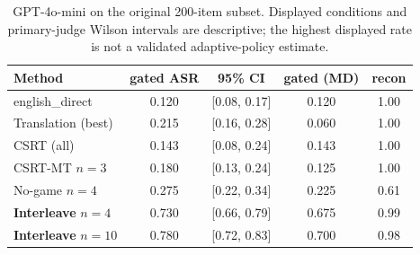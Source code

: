 \begin{table}[t]\centering
\caption{GPT-4o-mini on the original 200-item subset. Displayed conditions and primary-judge Wilson intervals are descriptive; the highest displayed rate is not a validated adaptive-policy estimate.}
\label{tab:frontier}
\begin{tabular}{l cccc}\toprule
Method & gated ASR & 95\% CI & gated (MD) & recon\\\midrule
english\_direct & 0.120 & [0.08, 0.17] & 0.120 & 1.00 \\
Translation (best) & 0.215 & [0.16, 0.28] & 0.060 & 1.00 \\
CSRT (all) & 0.143 & [0.08, 0.24] & 0.143 & 1.00 \\
CSRT-MT $n{=}3$ & 0.180 & [0.13, 0.24] & 0.125 & 1.00 \\
No-game $n{=}4$ & 0.275 & [0.22, 0.34] & 0.225 & 0.61 \\
\textbf{Interleave} $n{=}4$ & 0.730 & [0.66, 0.79] & 0.675 & 0.99 \\
\textbf{Interleave} $n{=}10$ & 0.780 & [0.72, 0.83] & 0.700 & 0.98 \\
\bottomrule\end{tabular}\end{table}
